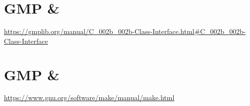 \section{GMP \& \cpp}

\url{https://gmplib.org/manual/C_002b_002b-Class-Interface.html#C_002b_002b-Class-Interface}

\item \cite{gmp}


\section{GMP \& \make}

\url{https://www.gnu.org/software/make/manual/make.html}

\item \cite{make}
